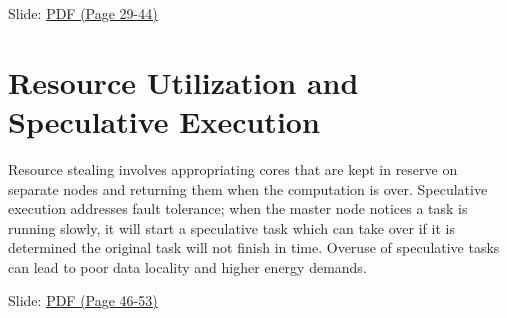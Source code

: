 
  Slide:
  \href{https://drive.google.com/open?id=0B88HKpainTSfT28zLTdKYWhGdGM}{PDF
  (Page 29-44)}

\section{Resource Utilization and Speculative Execution}

Resource stealing involves appropriating cores that are kept in reserve
on separate nodes and returning them when the computation is over.
Speculative execution addresses fault tolerance; when the master node
notices a task is running slowly, it will start a speculative task which
can take over if it is determined the original task will not finish in
time. Overuse of speculative tasks can lead to poor data locality and
higher energy demands.


  Slide:
  \href{https://drive.google.com/open?id=0B88HKpainTSfT28zLTdKYWhGdGM}{PDF
  (Page 46-53)}

